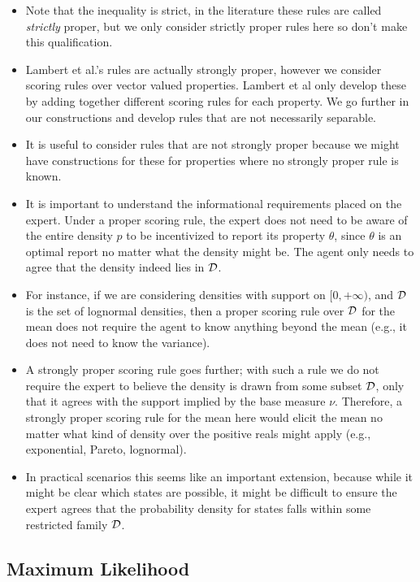 \begin{itemize}
\item Note that the inequality is strict, in the literature these rules are called \emph{strictly} proper, but we only consider strictly proper rules here so don't make this qualification.
\item Lambert et al.'s rules are actually strongly proper, however we consider scoring rules over vector valued properties. Lambert et al only develop these by adding together different scoring rules for each property. We go further in our constructions and develop rules that are not necessarily separable.
\item It is useful to consider rules that are not strongly proper because we might have constructions for these for properties where no strongly proper rule is known.
\item It is important to understand the informational requirements placed on the expert. Under a proper scoring rule, the expert does not need to be aware of the entire density $p$ to be incentivized to report its property $\theta$, since $\theta$ is an optimal report no matter what the density might be. The agent only needs to agree that the density indeed lies in $\mathcal{D}$.
\item For instance, if we are considering densities with support on $[0,+\infty)$, and $\mathcal{D}$ is the set of lognormal densities, then a proper scoring rule over $\mathcal{D}$ for the mean does not require the agent to know anything beyond the mean (e.g., it does not need to know the variance).  
\item A strongly proper scoring rule goes further; with such a rule we do not require the expert to believe the density is drawn from some subset $\mathcal{D}$, only that it agrees with the support implied by the base measure $\nu$. Therefore, a strongly proper scoring rule for the mean here would elicit the mean no matter what kind of density over the positive reals might apply (e.g., exponential, Pareto, lognormal).
\item In practical scenarios this seems like an important extension, because while it might be clear which states are possible, it might be difficult to ensure the expert agrees that the probability density for states falls within some restricted family $\mathcal{D}$.
\end{itemize}


\subsection{Maximum Likelihood}

